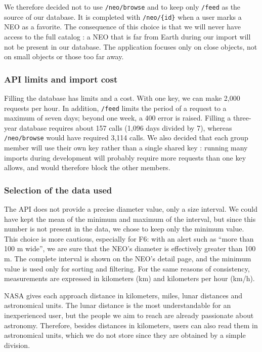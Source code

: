 We therefore decided not to use \texttt{/neo/browse} and to keep only
\texttt{/feed} as the source of our database. It is completed with
\texttt{/neo/\{id\}} when a user marks a NEO as a favorite. The consequence
of this choice is that we will never have access to the full catalog : a NEO
that is far from Earth during our import will not be present in our
database. The application focuses only on close objects, not on small
objects or those too far away.

\subsubsection{API limits and import cost}

Filling the database has limits and a cost. With one key, we can make 2,000
requests per hour. In addition, \texttt{/feed} limits the period of a
request to a maximum of seven days; beyond one week, a 400 error is raised.
Filling a three-year database requires about 157 calls (1,096 days divided
by 7), whereas \texttt{/neo/browse} would have required 3,114 calls. We also
decided that each group member will use their own key rather than a single
shared key : running many imports during development will probably require
more requests than one key allows, and would therefore block the other
members.

\subsubsection{Selection of the data used}

The API does not provide a precise diameter value, only a size interval. We
could have kept the mean of the minimum and maximum of the interval, but
since this number is not present in the data, we chose to keep only the
minimum value. This choice is more cautious, especially for F6: with an
alert such as ``more than 100 m wide'', we are sure that the NEO's diameter
is effectively greater than 100 m. The complete interval is shown on the
NEO's detail page, and the minimum value is used only for sorting and
filtering. For the same reasons of consistency, measurements are expressed
in kilometers (km) and kilometers per hour (km/h).

NASA gives each approach distance in kilometers, miles, lunar distances and
astronomical units. The lunar distance is the most understandable for an
inexperienced user, but the people we aim to reach are already passionate
about astronomy. Therefore, besides distances in kilometers, users can also
read them in astronomical units, which we do not store since they are
obtained by a simple division.

